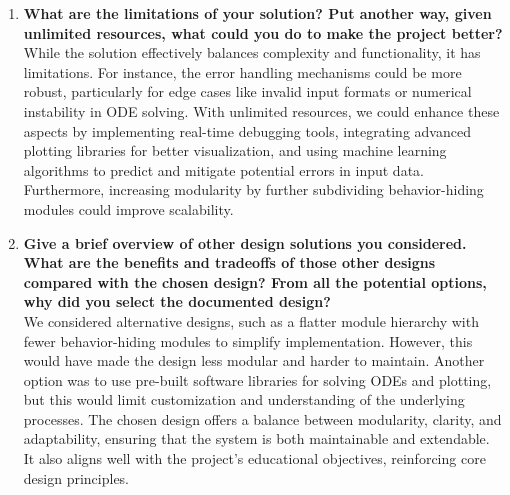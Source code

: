 \documentclass[12pt, titlepage]{article}
\begin{document}
\begin{enumerate}
  \item \textbf{What are the limitations of your solution? Put another way, given unlimited resources, what could you do to make the project better?}  \\
  While the solution effectively balances complexity and functionality, it has limitations. For instance, the error handling mechanisms could be more robust, particularly for edge cases like invalid input formats or numerical instability in ODE solving. With unlimited resources, we could enhance these aspects by implementing real-time debugging tools, integrating advanced plotting libraries for better visualization, and using machine learning algorithms to predict and mitigate potential errors in input data. Furthermore, increasing modularity by further subdividing behavior-hiding modules could improve scalability.

  \item \textbf{Give a brief overview of other design solutions you considered. What are the benefits and tradeoffs of those other designs compared with the chosen design? From all the potential options, why did you select the documented design?}  \\
  We considered alternative designs, such as a flatter module hierarchy with fewer behavior-hiding modules to simplify implementation. However, this would have made the design less modular and harder to maintain. Another option was to use pre-built software libraries for solving ODEs and plotting, but this would limit customization and understanding of the underlying processes. The chosen design offers a balance between modularity, clarity, and adaptability, ensuring that the system is both maintainable and extendable. It also aligns well with the project’s educational objectives, reinforcing core design principles.
\end{enumerate}
\end{document}
